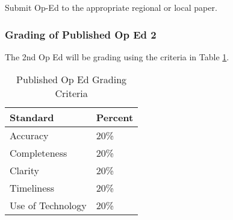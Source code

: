 Submit Op-Ed to the appropriate regional or local paper.



\subsubsection{Grading of Published Op Ed 2}

The 2nd Op Ed will be grading using the criteria in Table \ref{tab:oped2grading}.

\begin{table}[h]
\centering
\caption{Published Op Ed Grading Criteria}
\label{tab:oped2grading}
\begin{tabular}{ll}\hline
Standard            & Percent \\ \hline\hline    
Accuracy            & 20\%  \\
Completeness        & 20\% \\
Clarity             & 20\% \\
Timeliness          & 20\% \\
Use of Technology   & 20\% \\ \hline
\end{tabular}
\end{table}




